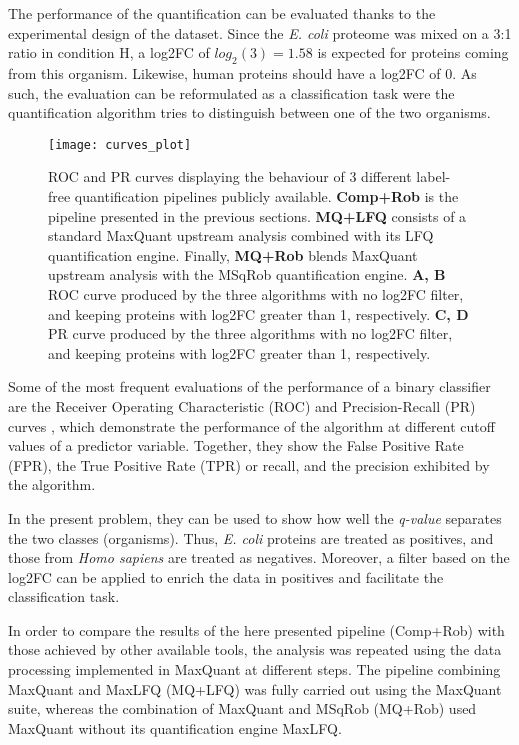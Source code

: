 The performance of the quantification can be evaluated thanks to the experimental design of the dataset. Since the \textit{E. coli} proteome was mixed on a 3:1 ratio in condition H, a \ac{log2FC} of $log_2(3)=1.58$ is expected for proteins coming from this organism. Likewise, human proteins should have a \ac{log2FC} of 0. As such, the evaluation can be reformulated as a classification task were the quantification algorithm tries to distinguish between one of the two organisms.


\begin{figure}[H]
\centering
\texttt{[image: curves\_plot]}
\caption[Classifier evaluation: ROC and PR curves]{ROC and PR curves displaying the behaviour of 3 different label-free quantification pipelines publicly available. \textbf{Comp+Rob} is the pipeline presented in the previous sections. \textbf{MQ+LFQ} consists of a standard MaxQuant upstream analysis combined with its LFQ quantification engine. Finally, \textbf{MQ+Rob} blends MaxQuant upstream analysis with the MSqRob quantification engine. \textbf{A, B} ROC curve produced by the three algorithms with no \ac{log2FC} filter, and keeping proteins with \ac{log2FC} greater than 1, respectively. \textbf{C, D} PR curve produced by the three algorithms with no \ac{log2FC} filter, and keeping proteins with \ac{log2FC} greater than 1, respectively.}
\label{fig:roc_curves}
\end{figure}


Some of the most frequent evaluations of the performance of a binary classifier are the Receiver Operating Characteristic (ROC) and Precision-Recall (PR) curves \cite{Bradley1997}, which demonstrate the performance of the algorithm at different cutoff values of a predictor variable. Together, they show the False Positive Rate (FPR), the True Positive Rate (TPR) or recall, and the precision exhibited by the algorithm.




In the present problem, they can be used to show how well the \textit{q-value} separates the two classes (organisms). Thus, \textit{E. coli} proteins are treated as positives, and those from \textit{Homo sapiens} are treated as negatives. Moreover, a filter based on the \ac{log2FC} can be applied to enrich the data in positives and facilitate the classification task.

In order to compare the results of the here presented pipeline (Comp+Rob) with those achieved by other available tools, the analysis was repeated using the data processing implemented in MaxQuant \cite{Cox2008} at different steps. The pipeline combining MaxQuant and MaxLFQ (MQ+LFQ) was fully carried out using the MaxQuant suite, whereas the combination of MaxQuant and MSqRob (MQ+Rob) used MaxQuant without its quantification engine MaxLFQ.

